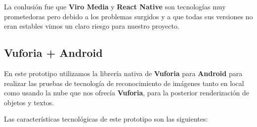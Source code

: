 \begin{flushleft}
La conlusión fue que \textbf{Viro Media} y \textbf{React Native} son tecnologías muy prometedoras pero debido a los
 problemas surgidos y a que todas sus versiones no eran estables vimos un claro riesgo para
 nuestro proyecto.
\end{flushleft}

\newpage
\subsection{Vuforia + Android} 
\label{makereference3.6.3} 
 
\begin{flushleft}
En este prototipo utilizamos la librería nativa de \textbf{Vuforia} para \textbf{Android} para 
realizar las pruebas de tecnología de reconocimiento de imágenes tanto en  
local como usando la nube que nos ofrecía \textbf{Vuforia}, para la posterior renderización
de objetos y textos.

Las características tecnológicas de este prototipo son las siguientes:
\end{flushleft}

